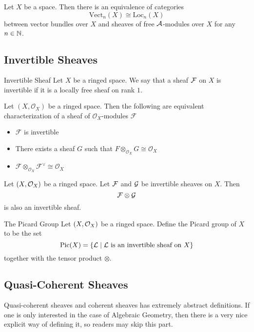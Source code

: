 \documentclass[a4paper]{article}
\begin{document}
\begin{thm}{}{} Let $X$ be a space. Then there is an equivalence of categories $$\text{Vect}_n(X)\cong\text{Loc}_n(X)$$ between vector bundles over $X$ and sheaves of free $\mathcal{A}$-modules over $X$ for any $n\in\mathbb{N}$. 
\end{thm}

\subsection{Invertible Sheaves}
\begin{defn}{Invertible Sheaf}{} Let $X$ be a ringed space. We say that a sheaf $\mathcal{F}$ on $X$ is invertible if it is a locally free sheaf on rank $1$. 
\end{defn}

\begin{thm}{}{} Let $(X,\mathcal{O}_X)$ be a ringed space. Then the following are equivalent characterization of a sheaf of $\mathcal{O}_X$-modules $\mathcal{F}$
\begin{itemize}
\item $\mathcal{F}$ is invertible
\item There exists a sheaf $G$ such that $F\otimes_{\mathcal{O}_X}G\cong\mathcal{O}_X$
\item $\mathcal{F}\otimes_{\mathcal{O}_X}\mathcal{F}^{\vee}\cong\mathcal{O}_X$
\end{itemize}
\end{thm}

\begin{prp}{}{} Let $(X,\mathcal{O}_X)$ be a ringed space. Let $\mathcal{F}$ and $\mathcal{G}$ be invertible sheaves on $X$. Then $$\mathcal{F}\otimes\mathcal{G}$$ is also an invertible sheaf. 
\end{prp}

\begin{defn}{The Picard Group}{} Let $(X,\mathcal{O}_X)$ be a ringed space. Define the Picard group of $X$ to be the set $$\text{Pic}(X)=\{\mathcal{L}\;|\;\mathcal{L}\text{ is an invertible sheaf on }X\}$$ together with the tensor product $\otimes$. 
\end{defn}

\subsection{Quasi-Coherent Sheaves}
Quasi-coherent sheaves and coherent sheaves has extremely abstract definitions. If one is only interested in the case of Algebraic Geometry, then there is a very nice explicit way of defining it, so readers may skip this part. 
\end{document}
